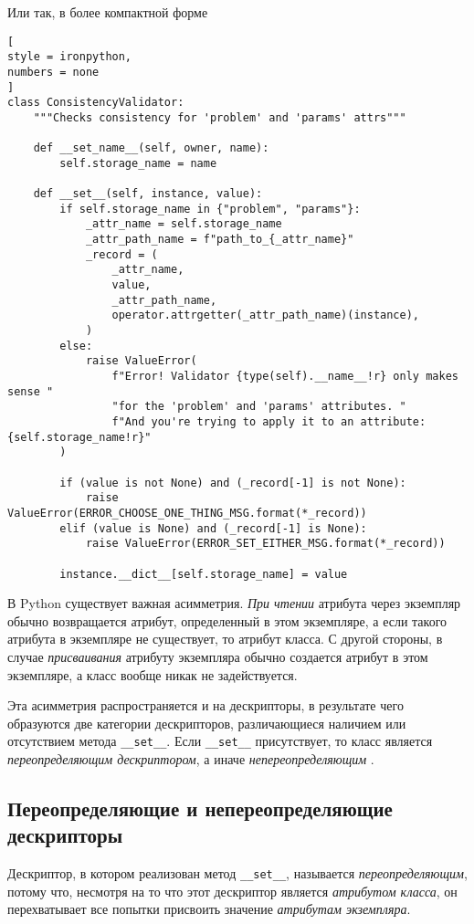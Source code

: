 \documentclass[%
	11pt,
	a4paper,
	utf8,
		]{article}
\begin{document}
Или так, в более компактной форме
\begin{lstlisting}[
style = ironpython,
numbers = none
]
class ConsistencyValidator:
	"""Checks consistency for 'problem' and 'params' attrs"""

	def __set_name__(self, owner, name):
		self.storage_name = name

	def __set__(self, instance, value):
		if self.storage_name in {"problem", "params"}:
			_attr_name = self.storage_name
			_attr_path_name = f"path_to_{_attr_name}"
			_record = (
				_attr_name,
				value,
				_attr_path_name,
				operator.attrgetter(_attr_path_name)(instance),
			)
		else:
			raise ValueError(
				f"Error! Validator {type(self).__name__!r} only makes sense "
				"for the 'problem' and 'params' attributes. "
				f"And you're trying to apply it to an attribute: {self.storage_name!r}"
		)

		if (value is not None) and (_record[-1] is not None):
			raise ValueError(ERROR_CHOOSE_ONE_THING_MSG.format(*_record))
		elif (value is None) and (_record[-1] is None):
			raise ValueError(ERROR_SET_EITHER_MSG.format(*_record))

		instance.__dict__[self.storage_name] = value
\end{lstlisting}

В Python существует важная асимметрия. \emph{При чтении} атрибута через экземпляр обычно возвращается атрибут, определенный в этом экземпляре, а если такого атрибута в экземпляре не существует, то атрибут класса. С другой стороны, в случае \emph{присваивания} атрибуту экземпляра обычно создается атрибут в этом экземпляре, а класс вообще никак не задействуется.

Эта асимметрия распространяется и на дескрипторы, в результате чего образуются две категории дескрипторов, различающиеся наличием или отсутствием метода \verb|__set__|. Если \verb*|__set__| присутствует, то класс является \emph{переопределяющим дескриптором}, а иначе \emph{непереопределяющим} \cite[]{ramalho:python-2022}.

\subsection{Переопределяющие и непереопределяющие дескрипторы}

Дескриптор, в котором реализован метод \verb|__set__|, называется \emph{переопределяющим}, потому что, несмотря на то что этот дескриптор является \emph{атрибутом класса}, он перехватывает все попытки присвоить значение \emph{атрибутам экземпляра}.
\end{document}
